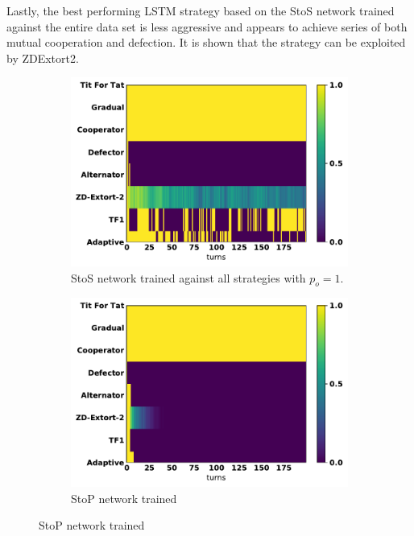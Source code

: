 Lastly, the best performing LSTM strategy based on the StoS network trained
against the entire data set is less aggressive and appears to achieve series of
both mutual cooperation and defection. It is shown that the strategy can be
exploited by ZDExtort2.


\begin{figure}[!htbp]
    \begin{subfigure}{.32\textwidth}
        \includegraphics[width=\textwidth]{src/chapters/07/img/s_t_s_against_seven_opponents.pdf}
        \caption{StoS network trained
        against all strategies with $p_o=1$.}
    \end{subfigure}\hfill
\begin{subfigure}{.32\textwidth}
        \includegraphics[width=\textwidth]{src/chapters/07/img/s_t_p_twenty_against_seven_opponents.pdf}
        \caption{StoP network trained
}
\end{subfigure}
\end{figure}
